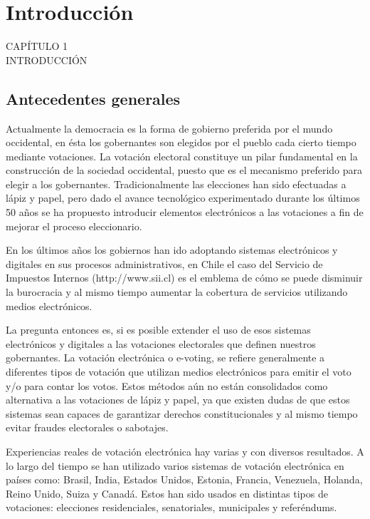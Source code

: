 
{
\Hide
\chapter{Introducción}
}

\begin{titular} 
	\uppercase{
	capítulo 1 \\
	introducción \\
	}
\end{titular}


\section{Antecedentes generales}

Actualmente la democracia es la forma de gobierno preferida por el mundo
occidental, en ésta los gobernantes son elegidos por el pueblo cada cierto tiempo
mediante votaciones. La votación electoral constituye un pilar fundamental en 
la construcción de la sociedad occidental, puesto que es el mecanismo preferido 
para elegir a los gobernantes. Tradicionalmente las elecciones han sido efectuadas 
a lápiz y papel, pero dado el avance tecnológico experimentado durante los últimos 
50 años se ha propuesto introducir elementos electrónicos a las votaciones 
a fin de mejorar el proceso eleccionario.

En los últimos años los gobiernos han ido adoptando sistemas electrónicos y digitales
en sus procesos administrativos, en Chile el caso del Servicio de Impuestos Internos
(http://www.sii.cl) es el emblema de cómo se puede disminuir la burocracia y al mismo
tiempo aumentar la cobertura de servicios utilizando medios electrónicos. 

La pregunta entonces es, si es posible extender el uso de esos sistemas electrónicos
y digitales a las votaciones electorales que definen nuestros gobernantes. La votación 
electrónica o e-voting, se refiere generalmente a diferentes tipos de votación que 
utilizan medios electrónicos para emitir el voto y/o para contar los votos. Estos métodos
aún no están consolidados como alternativa a las votaciones de lápiz y papel, ya que 
existen dudas de que estos sistemas sean capaces de garantizar derechos 
constitucionales y al mismo tiempo evitar fraudes electorales o sabotajes.  

Experiencias reales de votación electrónica hay varias y con diversos resultados. 
A lo largo del tiempo se han utilizado varios sistemas de votación electrónica 
en países como: Brasil, India, Estados Unidos, Estonia, Francia, Venezuela, 
Holanda, Reino Unido, Suiza y Canadá. Estos han sido usados en distintas 
tipos de votaciones: elecciones residenciales, senatoriales, municipales y referéndums. 

